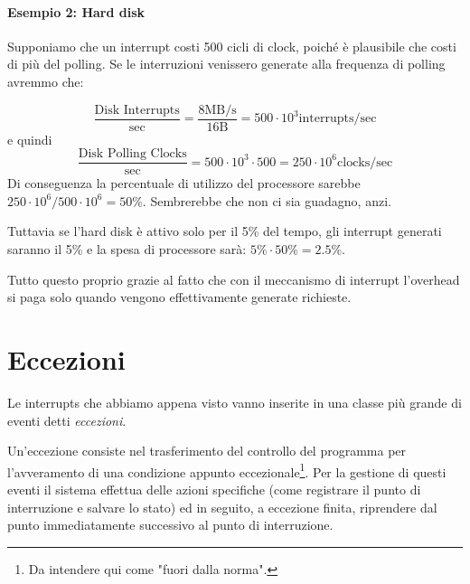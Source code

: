 \documentclass[class=book, crop=false, oneside]{standalone}
\begin{document}
\paragraph{Esempio 2: Hard disk} Supponiamo che un interrupt costi 500 cicli di clock, poiché è plausibile che costi di più del polling. Se le interruzioni venissero generate alla frequenza di polling avremmo che:

\begin{equation*}
	\frac{\textrm{Disk Interrupts}}{\textrm{sec}}=\frac{8 \textrm{MB/s}}{16\textrm{B}}=500\cdot 10^{3}\textrm{interrupts}/\textrm{sec}
\end{equation*}
e quindi
\begin{equation*}
	\frac{\textrm{Disk Polling Clocks}}{\textrm{sec}}=500\cdot 10^{3}\cdot 500=250\cdot 10^6 \textrm{clocks}/\textrm{sec}
\end{equation*}
Di conseguenza la percentuale di utilizzo del processore sarebbe \(250\cdot 10^6/500\cdot 10^6= 50\%\). Sembrerebbe che non ci sia guadagno, anzi.

Tuttavia se l'hard disk è attivo solo per il 5\% del tempo, gli interrupt generati saranno il 5\% e la spesa di processore sarà: \(5\% \cdot 50\%=2.5\%\).

Tutto questo proprio grazie al fatto che con il meccanismo di interrupt l'overhead si paga solo quando vengono effettivamente generate richieste.

\section{Eccezioni}
Le interrupts che abbiamo appena visto vanno inserite in una classe più grande di eventi detti \emph{eccezioni}.

Un'eccezione consiste nel trasferimento del controllo del programma per l'avveramento di una condizione appunto eccezionale\footnote{Da intendere qui come "fuori dalla norma".}.
Per la gestione di questi eventi il sistema effettua delle azioni specifiche (come registrare il punto di interruzione e salvare lo stato) ed in seguito, a eccezione finita, riprendere dal punto immediatamente successivo al punto di interruzione.
\end{document}
